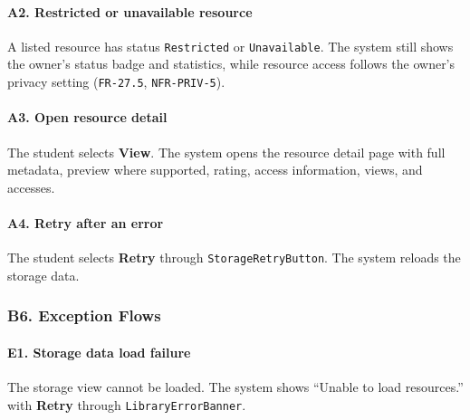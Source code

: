 \documentclass[12pt]{article}
\begin{document}
\hypertarget{sec:a2-restricted-or-unavailable-resource}{}
\paragraph*{A2. Restricted or unavailable resource}
\par\medskip

A listed resource has status \texttt{Restricted} or \texttt{Unavailable}. The system still shows the owner's status badge and statistics, while resource access follows the owner's privacy setting (\texttt{FR-27.5}, \texttt{NFR-PRIV-5}).
\par\medskip

\hypertarget{sec:a3-open-resource-detail}{}
\paragraph*{A3. Open resource detail}
\par\medskip

The student selects \textbf{View}. The system opens the resource detail page with full metadata, preview where supported, rating, access information, views, and accesses.
\par\medskip

\hypertarget{sec:a4-retry-after-an-error}{}
\paragraph*{A4. Retry after an error}
\par\medskip

The student selects \textbf{Retry} through \texttt{StorageRetryButton}. The system reloads the storage data.
\par\medskip

\hypertarget{sec:b6-exception-flows}{}
\subsubsection*{B6. Exception Flows}
\par\medskip

\hypertarget{sec:e1-storage-data-load-failure}{}
\paragraph*{E1. Storage data load failure}
\par\medskip

The storage view cannot be loaded. The system shows “Unable to load resources.” with \textbf{Retry} through \texttt{LibraryErrorBanner}.
\par\medskip
\end{document}
